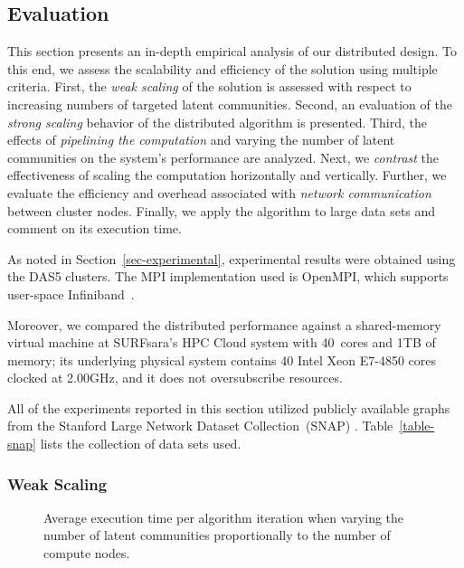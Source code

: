 \subsection{Evaluation}

This section presents an in-depth empirical analysis of our distributed design.
To this end, we assess the scalability and
efficiency of the solution using multiple criteria.
%
First, the \textit{weak scaling} of the solution is assessed with respect to increasing
numbers of targeted latent communities.
%
Second, an evaluation of the \textit{strong scaling} behavior of the distributed
algorithm is presented.
%
Third, the effects of \textit{pipelining the computation} and varying the number of latent communities on the system's
performance are analyzed.
%
Next, we \textit{contrast} the effectiveness of scaling the computation horizontally
and vertically.
%
Further, we evaluate the efficiency and overhead associated with \textit{network
communication} between cluster nodes.
%
Finally, we apply the algorithm to large data sets and comment on its execution time.

As noted in Section~\ref{sec-experimental}, experimental results
were obtained using the DAS5 clusters.
The MPI implementation used is OpenMPI, which supports
user-space Infiniband~\cite{gabriel04:_open_mpi}.

Moreover, we compared the distributed performance against a shared-memory virtual machine
at SURFsara's HPC Cloud system with 40~cores and 1TB of memory; its underlying
physical system contains 40 Intel Xeon E7-4850 cores clocked at 2.00GHz, and
it does not oversubscribe resources.

All of the experiments reported in this section utilized
publicly available graphs from the Stanford Large Network Dataset
Collection~(SNAP) \cite{snapnets}. Table~\ref{table-snap} lists the
collection of data sets used.

\subsubsection{Weak Scaling}

\begin{figure}[tb] %
  \centering
  \caption{Average execution time per algorithm iteration when varying
  the number of latent communities proportionally to the number of compute
  nodes.}
  \label{fig-weak-scaling}
\end{figure}

